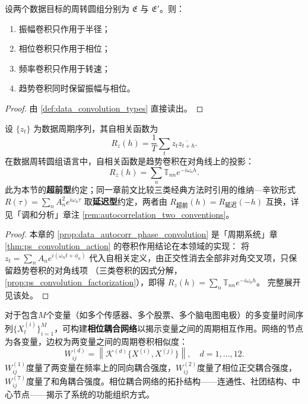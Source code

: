 \begin{theorem}[三类卷积在数据周转圆组上的作用]\label{thm:data_convolution_action}
设两个数据目标的周转圆组分别为 $\mathfrak E$ 与 $\mathfrak E'$。则：
\begin{enumerate}[label=(\roman*)]
    \item 振幅卷积只作用于半径；
    \item 相位卷积只作用于相位；
    \item 频率卷积只作用于转速；
    \item 趋势卷积同时保留振幅与相位。
\end{enumerate}
\end{theorem}

\begin{proof}
由 \cref{def:data_convolution_types} 直接读出。
\end{proof}

\begin{proposition}[自相关与趋势卷积]\label{prop:data_autocorr_phase_convolution}
设 $\{z_t\}$ 为数据周期序列，其自相关函数为
\[
R_z(h)=\frac1T\sum_t z_t\overline{z_{t+h}}.
\]
在数据周转圆组语言中，自相关函数是趋势卷积在对角线上的投影：
\[
R_z(h)=\sum_n\mathbb T_{nn}e^{-i\omega_n h}.
\]
此为本节的\textbf{超前型}约定；同一章前文比较三类经典方法时引用的维纳—辛钦形式 $R(\tau)=\sum_n A_n^2 e^{i\omega_n\tau}$ 取\textbf{延迟型}约定，两者由 $R_{\text{超前}}(h)=R_{\text{延迟}}(-h)$ 互换，详见「调和分析」章注 \ref{rem:autocorrelation_two_conventions}。
\end{proposition}

\begin{proof}
本章的 \cref{prop:data_autocorr_phase_convolution} 是「周期系统」章 \cref{thm:ps_convolution_action} 的卷积作用结论在本领域的实现：
将 $z_t=\sum_n A_n e^{i(\omega_n t+\phi_n)}$ 代入自相关定义，由正交性消去全部非对角交叉项，只保留趋势卷积的对角线项
（三类卷积的因式分解，\cref{prop:ps_convolution_factorization}），即得 $R_z(h)=\sum_n\mathbb T_{nn}e^{-i\omega_n h}$。
完整展开见该处。
\end{proof}

\begin{definition}[相位耦合网络的构建]\label{def:phase_coupling_network}
对于包含$M$个变量（如多个传感器、多个股票、多个脑电图电极）的多变量时间序列$\{X_t^{(i)}\}_{i=1}^{M}$，可构建\textbf{相位耦合网络}以揭示变量之间的周期相互作用。网络的节点为各变量，边权为两变量之间的周期卷积相似度：
\[
W_{ij}^{(d)} = \left\| \mathcal{K}^{(d)}\{X^{(i)}, X^{(j)}\} \right\|, \quad d = 1,\dots,12.
\]
$W_{ij}^{(1)}$度量了两变量在频率上的同向耦合强度，$W_{ij}^{(2)}$度量了相位正交耦合强度，$W_{ij}^{(7)}$度量了和角耦合强度。相位耦合网络的拓扑结构——连通性、社团结构、中心节点——揭示了系统的功能组织方式。
\end{definition}

